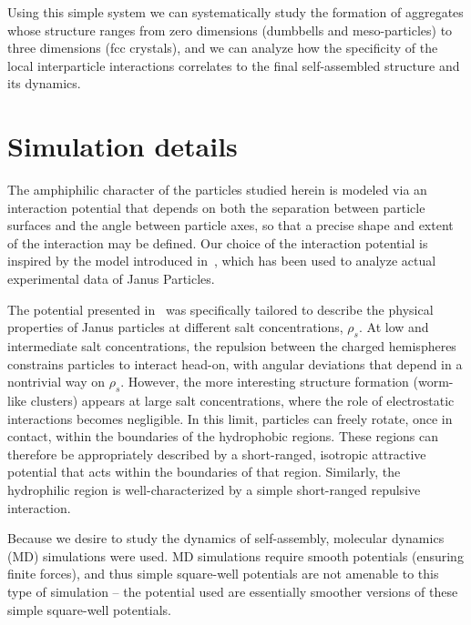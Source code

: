 Using this simple system we can systematically study the formation of aggregates whose structure ranges from zero dimensions (dumbbells and meso-particles) to three dimensions (fcc crystals), and we can analyze how  the specificity of the local interparticle interactions correlates to the final self-assembled structure and its dynamics.


\section{Simulation details}
The amphiphilic character of the particles studied herein is modeled via an interaction potential that depends on both the separation between particle surfaces and the angle between particle axes, so that a precise shape and extent of the interaction may be defined.  
Our choice of the interaction potential is inspired by the model introduced in~\cite{Hong2}, which has been used to analyze actual experimental data of Janus Particles.

The potential presented in~\cite{Hong2} was specifically tailored to describe the physical properties of Janus particles at different salt concentrations, $\rho_s$.
At low and intermediate salt concentrations,  the repulsion between the charged hemispheres constrains  particles to interact head-on, with angular deviations that depend in a nontrivial way on $\rho_s$.
However, the more interesting structure formation (worm-like clusters) appears at large salt concentrations, where the role of electrostatic interactions becomes negligible. 
In this limit, particles can freely rotate, once in contact, within the boundaries of the hydrophobic regions.  
These regions can therefore be appropriately described by a short-ranged, isotropic attractive potential that acts within the boundaries of that region. 
Similarly, the hydrophilic region is well-characterized by a simple short-ranged repulsive interaction. 

Because we desire to study the dynamics of self-assembly, molecular dynamics (MD) simulations were used.
MD simulations require smooth potentials (ensuring finite forces), and thus simple square-well potentials are not amenable to this type of simulation -- the potential used are essentially smoother versions of these simple square-well potentials.

